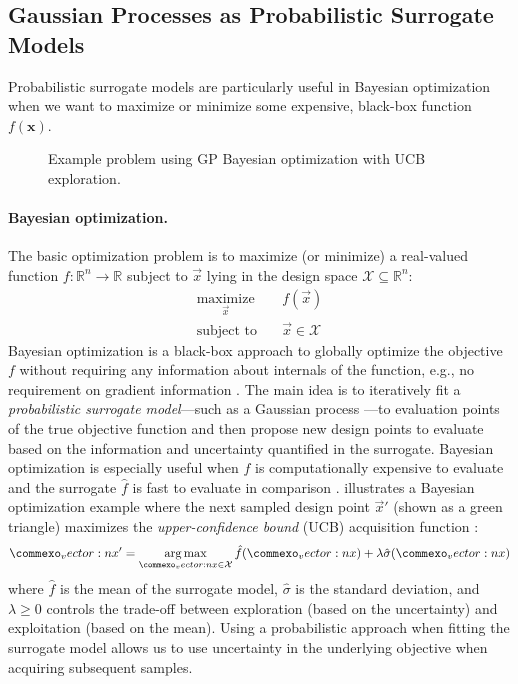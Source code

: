 \subsection{Gaussian Processes as Probabilistic Surrogate Models}\label{sec:gp}
Probabilistic surrogate models are particularly useful in Bayesian optimization when we want to maximize or minimize some expensive, black-box function $f(\mathbf{x})$.


\begin{figure}[b!]
    \centering
    \resizebox{0.85\textwidth}{!}{%
        
    }
    \caption{Example problem using GP Bayesian optimization with UCB exploration.}
    \label{fig:bayesian_optimization}
\end{figure}


\paragraph{Bayesian optimization.}
The basic optimization problem \cite{optbook} is to maximize (or minimize) a real-valued function $f: \mathbb{R}^n \to \mathbb{R}$ subject to $\vec{x}$ lying in the design space $\mathcal{X} \subseteq \mathbb{R}^n$:
\begin{align}
    \operatorname*{maximize}_{\vec{x}} \quad& f(\vec{x})\\
    \textrm{subject to} \quad& \vec{x} \in \mathcal{X}\nonumber
\end{align}
Bayesian optimization is a black-box approach to globally optimize the objective $f$ without requiring any information about internals of the function, e.g., no requirement on gradient information \cite{frazier2018tutorial,garnett2023bayesian}.
The main idea is to iteratively fit a \textit{probabilistic surrogate model}---such as a Gaussian process \cite{williams2006gaussian}---to evaluation points of the true objective function and then propose new design points to evaluate based on the information and uncertainty quantified in the surrogate.
Bayesian optimization is especially useful when $f$ is computationally expensive to evaluate and the surrogate $\hat{f}$ is fast to evaluate in comparison \cite{frazier2018tutorial}.
 illustrates a Bayesian optimization example where the next sampled design point $\vec{x}'$ (shown as a green triangle) maximizes the \textit{upper-confidence bound} (UCB) acquisition function \cite{optbook}:
\begin{equation}
    \vec{x}' = \argmax_{\vec{x} \in \mathcal{X}} \hat{f}(\vec{x}) + \lambda\hat{\sigma}(\vec{x})
\end{equation}
where $\hat{f}$ is the mean of the surrogate model, $\hat{\sigma}$ is the standard deviation, and $\lambda \ge 0$ controls the trade-off between exploration (based on the uncertainty) and exploitation (based on the mean). Using a probabilistic approach when fitting the surrogate model allows us to use uncertainty in the underlying objective when acquiring subsequent samples.


